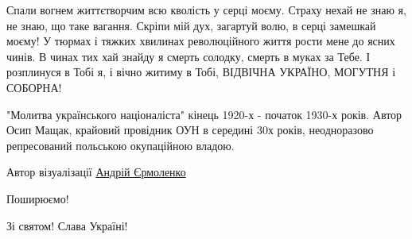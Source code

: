 Спали вогнем життєтворчим всю кволість у серці моєму. Страху нехай не знаю я,
не знаю, що таке вагання. Скріпи мій дух, загартуй волю, в серці замешкай
моєму! У тюрмах і тяжких хвилинах революційного життя рости мене до ясних
чинів. В чинах тих хай знайду я смерть солодку, смерть в муках за Тебе. І
розплинуся в Тобі я, і вічно житиму в Тобі, ВІДВІЧНА УКРАЇНО, МОГУТНЯ і
СОБОРНА!

"Молитва українського націоналіста" кінець 1920-х - початок 1930-х років. Автор
Осип Мащак, крайовий провідник ОУН в середині 30х років, неодноразово
репресований польською окупаційною владою.

Автор візуалізації \href{https://www.facebook.com/profile.php?id=100024825341857}{Андрій Єрмоленко}

Поширюємо! 

Зі святом! Слава Україні!

